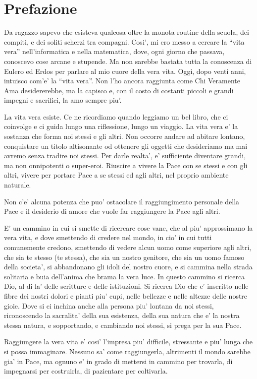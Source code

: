 \chapter{Prefazione}
Da ragazzo sapevo che esisteva qualcosa oltre la monota routine della scuola, dei compiti, e dei soliti scherzi tra compagni. Cosi', mi ero messo a cercare la ``vita vera'' nell'informatica e nella matematica, dove, ogni giorno che passava, conoscevo cose arcane e stupende. Ma non sarebbe bastata tutta la conoscenza di Eulero ed Erdos per parlare al mio cuore della vera vita. Oggi, dopo venti anni, intuisco com'e' la ``vita vera''. Non l'ho ancora raggiunta come Chi Veramente Ama desidererebbe, ma la capisco e, con il costo di costanti piccoli e grandi impegni e sacrifici, la amo sempre piu'.

La vita vera esiste. Ce ne ricordiamo quando leggiamo un bel libro, che ci coinvolge e ci guida lungo una riflessione, lungo un viaggio.  La vita vera e' la sostanza che forma noi stessi e gli altri. Non occorre andare ad abitare lontano, conquistare un titolo altisonante od ottenere gli oggetti che desideriamo ma mai avremo senza tradire noi stessi. Per darle realta', e' sufficiente diventare grandi, ma non onnipotenti o super-eroi. Riuscire a vivere la Pace con se stessi e con gli altri, vivere per portare Pace a se stessi ed agli altri, nel proprio ambiente naturale. 

Non c'e' alcuna potenza che puo' ostacolare il raggiungimento personale della Pace e il desiderio di amore che vuole far raggiungere la Pace agli altri. 

E' un cammino in cui si smette di ricercare cose vane, che al piu' approssimano la vera vita, e dove smettendo di credere nel mondo, in cio' in cui tutti comunemente credono, smettendo di vedere alcun uomo come superiore agli altri, che sia te stesso (te stessa), che sia un nostro genitore, che sia un uomo famoso della societa', si abbandonano gli idoli del nostro cuore, e si cammina nella strada solitaria e buia dell'anima che brama la vera luce. In questo cammino si ricerca Dio, al di la' delle scritture e delle istituzioni. Si ricerca Dio che e' inscritto nelle fibre dei nostri dolori e pianti piu' cupi, nelle bellezze e nelle altezze delle nostre gioie. Dove si ci inchina anche alla persona piu' lontana da noi stessi, riconoscendo la sacralita' della sua esistenza, della sua natura che e' la nostra stessa natura, e sopportando, e cambiando noi stessi, si prega per la sua Pace.

Raggiungere la vera vita e' cosi' l'impresa piu' difficile, stressante e piu' lunga che si possa immaginare. Nessuno sa' come raggiungerla, altrimenti il mondo sarebbe gia' in Pace, ma ognuno e' in grado di mettersi in cammino per trovarla, di impegnarsi per costruirla, di pazientare per coltivarla.

